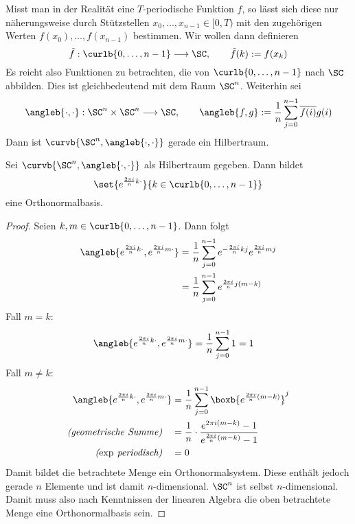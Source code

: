 		\par Misst man in der Realität eine $T$-periodische Funktion $f$, so lässt sich diese nur näherungsweise durch Stützstellen $x_0,\ldots,x_{n-1} \in [0,T)$ mit den zugehörigen Werten $f(x_0),\ldots,f(x_{n-1})$ bestimmen.
		Wir wollen dann definieren
		\[
		 	\tilde{f}:\curlb{0,\ldots,n-1}\longrightarrow\SC,\qquad \tilde{f}(k):=f(x_k)
		\]
		Es reicht also Funktionen zu betrachten, die von $\curlb{0,\ldots,n-1}$ nach $\SC$ abbilden.
		Dies ist gleichbedeutend mit dem Raum $\SC^n$.
		Weiterhin sei
		\[
			\angleb{\cdot,\cdot}:\SC^n\times\SC^n\longrightarrow\SC,\qquad \angleb{f,g}:=\frac{1}{n}\sum_{j=0}^{n-1} \overline{f(i)}g(i)
		\]
		Dann ist $\curvb{ \SC^n, \angleb{\cdot,\cdot} }$ gerade ein Hilbertraum.
		\begin{proposition*}
			Sei $\curvb{ \SC^n, \angleb{\cdot,\cdot} }$ als Hilbertraum gegeben.
			Dann bildet 
			\[
				\set{e^{\frac{2\pi i}{n}k\cdot}}{k\in\curlb{0,\ldots,n-1}}
			\]
			eine Orthonormalbasis.

			\begin{proof}
				Seien $k,m \in \curlb{0,\ldots,n-1}$. Dann folgt
				\begin{align*}
					\angleb{e^{\frac{2\pi i}{n}k\cdot}, e^{\frac{2\pi i}{n}m\cdot}} &= \frac{1}{n}\sum_{j=0}^{n-1} e^{-\frac{2\pi i}{n}kj} e^{ \frac{2\pi i}{n}mj } \\
					&= \frac{1}{n}\sum_{j=0}^{n-1} e^{ \frac{2\pi i}{n}j(m-k) }
				\end{align*}
				Fall $m=k$:
				\begin{align*}
					\angleb{e^{\frac{2\pi i}{n}k\cdot}, e^{\frac{2\pi i}{n}m\cdot}} &= \frac{1}{n} \sum_{j=0}^{n-1} 1 = 1
				\end{align*}
				Fall $m\neq k$:
				\begin{align*}
					\angleb{e^{\frac{2\pi i}{n}k\cdot}, e^{\frac{2\pi i}{n}m\cdot}} &= \frac{1}{n} \sum_{j=0}^{n-1} \boxb{e^{ \frac{2\pi i}{n}(m-k) }}^j \\
					\textit{(geometrische Summe)} \quad &= \frac{1}{n}\cdot \frac{e^{2\pi i(m-k)} -1}{e^{\frac{2\pi i}{n}(m-k)} -1} \\
					\textit{($\exp$ periodisch)} \quad &= 0
				\end{align*}
				Damit bildet die betrachtete Menge ein Orthonormalsystem.
				Diese enthält jedoch gerade $n$ Elemente und ist damit $n$-dimensional.
				$\SC^n$ ist selbst $n$-dimensional.
				Damit muss also nach Kenntnissen der linearen Algebra die oben betrachtete Menge eine Orthonormalbasis sein.
			\end{proof}
		\end{proposition*}
